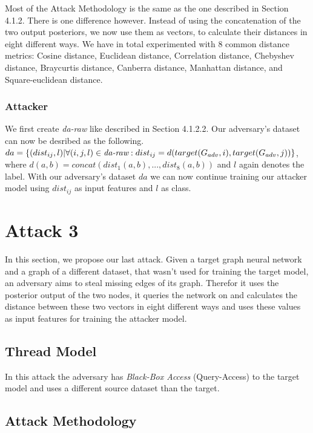       Most of the Attack Methodology is the same as the one described in Section 4.1.2.
      There is one difference however.
      Instead of using the concatenation of the two output posteriors, we now use them as vectors, to calculate their distances in eight different ways.
      We have in total experimented with 8 common distance metrics: Cosine distance, Euclidean distance, Correlation distance, Chebyshev distance, Braycurtis distance, Canberra distance, Manhattan distance, and Square-euclidean distance.

      \subsubsection{Attacker}

        We first create \emph{da-raw} like described in Section 4.1.2.2.
        Our adversary's dataset can now be desribed as the following.
        $da = \{(dist_{ij}, l) | \forall (i,j,l)\in\emph{da-raw}: dist_{ij} = d(target(G_{adv}, i), target(G_{adv}, j))\}$, where $d(a,b) = concat(dist_1(a,b), ..., dist_8(a,b))$ and $l$ again denotes the label.
        With our adversary's dataset $da$ we can now continue training our attacker model using $dist_{ij}$ as input features and $l$ as class.

  \section{Attack 3}

    In this section, we propose our last attack. Given a target graph neural network and a graph of a different dataset, that wasn't used for training the target model, an adversary aims to steal missing edges of its graph.
    Therefor it uses the posterior output of the two nodes, it queries the network on and calculates the distance between these two vectors in eight different ways and uses these values as input features for training the attacker model.

    \subsection{Thread Model}

      In this attack the adversary has \emph{Black-Box Access} (Query-Access) to the target model and uses a different source dataset than the target.

    \subsection{Attack Methodology}

